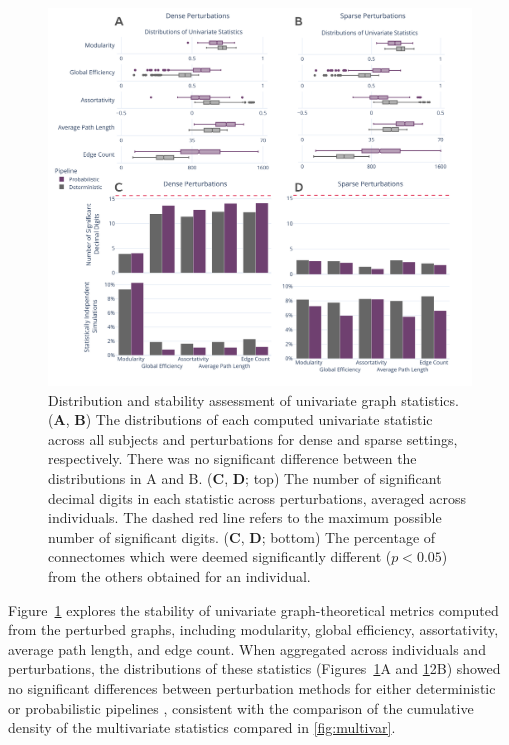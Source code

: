 \documentclass[fleqn,10pt]{SelfArx} %
\newcommand{\new}[1]{{\color{blue} #1}}
\begin{document}
\begin{figure}[ht]\centering
\includegraphics[width=\linewidth]{figures/figS2_univariate_differences.pdf}
\caption{Distribution and stability assessment of univariate graph statistics. (\textbf{A}, \textbf{B}) The
distributions of each computed univariate statistic across all subjects and perturbations for \new{dense} and \new{sparse}
settings, respectively. There was no significant difference between the distributions in A and B. (\textbf{C},
\textbf{D}; top) The number of significant decimal digits in each statistic across perturbations, averaged across
individuals. The dashed red line refers to the maximum possible number of significant digits.
(\textbf{C}, \textbf{D}; bottom) The percentage of connectomes which were deemed significantly different
($p < 0.05$) from the others obtained for an individual.}
\label{sfig:univariate}
\end{figure}

Figure~\ref{sfig:univariate} explores the stability of univariate graph-theoretical metrics computed from the perturbed
graphs, including modularity, global efficiency, assortativity, average path length, and edge count. When aggregated
across individuals and perturbations, the distributions of these statistics (Figures~\ref{sfig:univariate}A and
\ref{sfig:univariate}2B) showed no significant differences between perturbation methods for either deterministic or
probabilistic pipelines\new{, consistent with the comparison of the cumulative density of the multivariate statistics
compared in \ref{fig:multivar}}.
\end{document}
